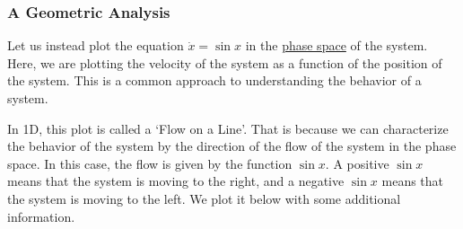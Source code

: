 \documentclass[11pt]{article}
\begin{document}
\subsubsection{A Geometric Analysis}\label{a-geometric-analysis}

Let us instead plot the equation \(\dot{x} = \sin x\) in the
\href{https://en.wikipedia.org/wiki/Phase_space}{phase space} of the
system. Here, we are plotting the velocity of the system as a function
of the position of the system. This is a common approach to
understanding the behavior of a system.

In 1D, this plot is called a `Flow on a Line'. That is because we can
characterize the behavior of the system by the direction of the flow of
the system in the phase space. In this case, the flow is given by the
function \(\sin x\). A positive \(\sin x\) means that the system is
moving to the right, and a negative \(\sin x\) means that the system is
moving to the left. We plot it below with some additional information.
\end{document}
